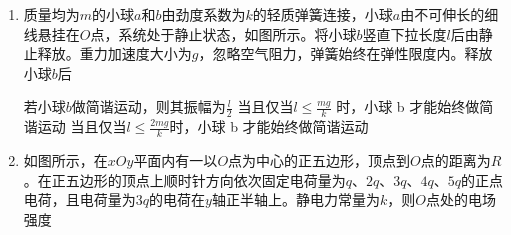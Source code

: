 \documentclass[\gkver]{gaokaozhenti}
\begin{document}
\begin{enumerate}
{	$I_{2}=\frac{U_{2}}{r+\left(\frac{n_{3}}{n_{4}}\right)^{2}R_\text{用户}}$

	可知 $U_{2}$ 增大，根据

	可知 $I_{2}$ 增大，根据 $U_{3}=I_{2}R_{x}$

	$U_{4}=\frac{n_{4}}{n_{3}}U_{3}$

	可知 $U_{3}$ 增大，根据用户端的电压

	可知用户端的电压增大，故 C 正确；

	D．由 C 选项可知，仅适当增加 $n_{2}$，$I_{2}$ 增大，整个电路消耗的电功率 $P_{1}=P_{2}=U_{2}I_{2}$

	由于 $U_{2}$ 增大，故整个电路消耗的电功率变大，故 D 错误。

	故选 AC。
}

\item 
质量均为$ m $的小球$ a $和$ b $由劲度系数为$ k $的轻质弹簧连接，小球$ a $由不可伸长的细线悬挂在$ O $点，系统处于静止状态，如图所示。将小球$ b $竖直下拉长度$ l $后由静止释放。重力加速度大小为$ g $，忽略空气阻力，弹簧始终在弹性限度内。释放小球$ b $后  



{若小球$ b $做简谐运动，则其振幅为$\frac l2$}
{当且仅当$l\leqslant\frac{mg}k$ 时，小球 b 才能始终做简谐运动}
{当且仅当$l\leqslant\frac{2mg}k$时，小球 b 才能始终做简谐运动}



\item 
如图所示，在$ xOy $平面内有一以$ O $点为中心的正五边形，顶点到$ O $点的距离为$ R $。在正五边形的顶点上顺时针方向依次固定电荷量为$ q $、$ 2q $、$ 3q $、$ 4q $、$ 5q $的正点电荷，且电荷量为$ 3q $的电荷在$ y $轴正半轴上。静电力常量为$ k $，则$ O $点处的电场强度  


\end{enumerate}
\end{document}

